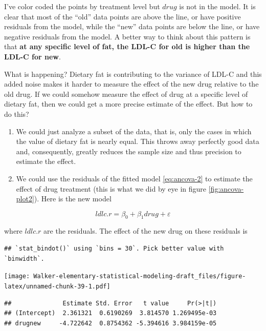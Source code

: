 \documentclass[]{book}
\begin{document}
I've color coded the points by treatment level but \(drug\) is not in
the model. It is clear that most of the ``old'' data points are above
the line, or have positive residuals from the model, while the ``new''
data points are below the line, or have negative residuals from the
model. A better way to think about this pattern is that \textbf{at any
specific level of fat, the LDL-C for old is higher than the LDL-C for
new}.

What is happening? Dietary fat is contributing to the variance of LDL-C
and this added noise makes it harder to measure the effect of the new
drug relative to the old drug. If we could somehow measure the effect of
drug at a specific level of dietary fat, then we could get a more
precise estimate of the effect. But how to do this?

\begin{enumerate}
\def\labelenumi{\arabic{enumi}.}
\item
  We could just analyze a subset of the data, that is, only the cases in
  which the value of dietary fat is nearly equal. This throws away
  perfectly good data and, consequently, greatly reduces the sample size
  and thus precision to estimate the effect.
\item
  We could use the residuals of the fitted model \eqref{eq:ancova-2} to
  estimate the effect of drug treatment (this is what we did by eye in
  figure \ref{fig:ancova-plot2}). Here is the new model
\end{enumerate}

\begin{equation}
ldlc.r = \beta_0 + \beta_1 drug + \varepsilon
\label{eq:ancova-3}
\end{equation}

where \(ldlc.r\) are the residuals. The effect of the new drug on these
residuals is

\begin{verbatim}
## `stat_bindot()` using `bins = 30`. Pick better value with `binwidth`.
\end{verbatim}

\texttt{[image: Walker-elementary-statistical-modeling-draft\_files/figure-latex/unnamed-chunk-39-1.pdf]}

\begin{verbatim}
##              Estimate Std. Error   t value     Pr(>|t|)
## (Intercept)  2.361321  0.6190269  3.814570 1.269495e-03
## drugnew     -4.722642  0.8754362 -5.394616 3.984159e-05
\end{verbatim}
\end{document}
